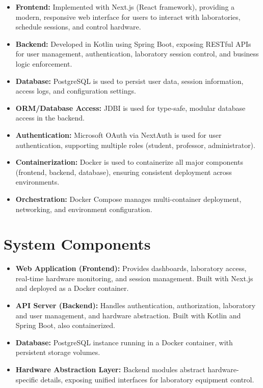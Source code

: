\begin{itemize}
    \item \textbf{Frontend:} Implemented with Next.js (React framework), providing a modern, responsive web interface for users to interact with laboratories, schedule sessions, and control hardware.
    \item \textbf{Backend:} Developed in Kotlin using Spring Boot, exposing RESTful APIs for user management, authentication, laboratory session control, and business logic enforcement.
    \item \textbf{Database:} PostgreSQL is used to persist user data, session information, access logs, and configuration settings.
    \item \textbf{ORM/Database Access:} JDBI is used for type-safe, modular database access in the backend.
    \item \textbf{Authentication:} Microsoft OAuth via NextAuth is used for user authentication, supporting multiple roles (student, professor, administrator).
    \item \textbf{Containerization:} Docker is used to containerize all major components (frontend, backend, database), ensuring consistent deployment across environments.
    \item \textbf{Orchestration:} Docker Compose manages multi-container deployment, networking, and environment configuration.
\end{itemize}

\section{System Components}

\begin{itemize}
    \item \textbf{Web Application (Frontend):} Provides dashboards, laboratory access, real-time hardware monitoring, and session management. Built with Next.js and deployed as a Docker container.
    \item \textbf{API Server (Backend):} Handles authentication, authorization, laboratory and user management, and hardware abstraction. Built with Kotlin and Spring Boot, also containerized.
    \item \textbf{Database:} PostgreSQL instance running in a Docker container, with persistent storage volumes.
    \item \textbf{Hardware Abstraction Layer:} Backend modules abstract hardware-specific details, exposing unified interfaces for laboratory equipment control.
\end{itemize}

